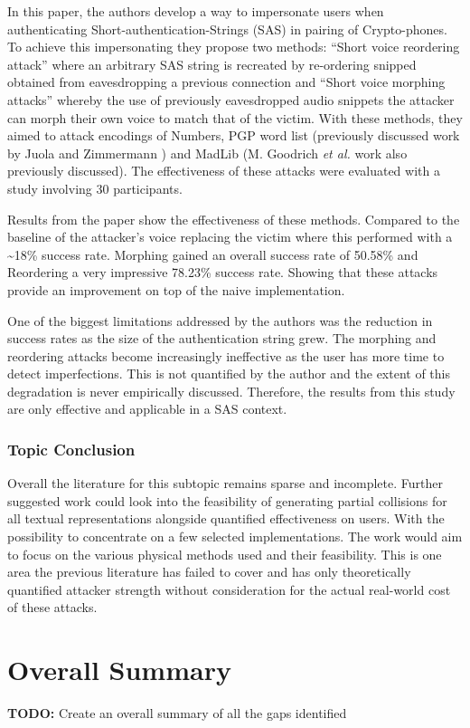 In this paper, the authors develop a way to 
impersonate users when authenticating 
Short-authentication-Strings (SAS) in pairing of 
Crypto-phones. To achieve this impersonating they propose 
two methods: ``Short voice reordering attack'' where an 
arbitrary SAS string is recreated by re-ordering snipped 
obtained from eavesdropping a previous connection
and ``Short voice morphing attacks'' whereby the use of 
previously eavesdropped audio snippets the attacker can
morph their own voice to match that of the victim. With 
these methods, they aimed to attack encodings of Numbers, 
PGP word list (previously discussed work by Juola and 
Zimmermann \cite{juola1996whole}) and MadLib (M. Goodrich 
\textit{et al.}\cite{goodrich2006loud} work also 
previously discussed). The effectiveness of these attacks 
were evaluated with a study involving 30 participants.

Results from the paper show the effectiveness of these 
methods. Compared to the baseline of the attacker's voice 
replacing the victim where this performed with a 
\textasciitilde18\% success rate. Morphing gained an 
overall success rate of 50.58\% and Reordering a very 
impressive 78.23\% success rate. Showing that these 
attacks provide an improvement on top of the naive implementation.

One of the biggest limitations addressed by the authors 
was the reduction in success rates as the size of the 
authentication string grew. The morphing and reordering 
attacks become increasingly ineffective as the user has 
more time to detect imperfections. This is not quantified by 
the author and the extent of this degradation is never 
empirically discussed. Therefore, the results from this 
study are only effective and applicable in a SAS context.



\subsubsection{Topic Conclusion}
Overall the literature for this subtopic remains sparse and incomplete. Further suggested work could look into the feasibility of generating partial collisions for all textual representations alongside quantified effectiveness on users. With the possibility to concentrate on a few selected implementations. The work would aim to focus on the various physical methods used and their feasibility. This is one area the previous literature has failed to cover and has only theoretically quantified attacker strength without consideration for the actual real-world cost of these attacks.

\section{Overall Summary}
\textbf{TODO: } Create an overall summary of all the gaps identified